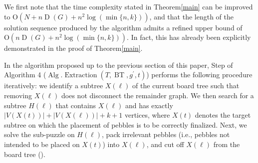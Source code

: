 \documentclass[letter,11pt]{article}
\theoremstyle{definition}
\theoremstyle{definition}
\DeclareMathOperator{\BT}{BT}
\DeclareMathOperator{\Alg}{Alg}
\DeclareMathOperator{\Extraction}{Extraction}
\DeclareMathOperator{\D}{D}
\newcommand{\1}{\boldmath$~1~$\unboldmath}
\newcommand{\Ord}{\mathrm{O}}
\newcommand{\tume}{\hspace*{0.2em}}
\newcommand{\maru}[1]{{\ooalign{\hfill$\small#1$\hfill\crcr\scalebox{1.3}{$\bigcirc$}}}}
\begin{document}
We first note that the time complexity stated in Theorem\tume\ref{main} can be improved to 
$\Ord(N+n\D(G) + n^2 \log(\min\{n,k\}))$, and that the length of the solution sequence produced by 
the algorithm admits a refined upper bound of $\Ord(n\D(G) + n^2 \log(\min\{n,k\}))$.
In fact, this has already been explicitly demonstrated in the proof of Theorem\tume\ref{main}.

In the algorithm proposed up to the previous section of this paper, Step \maru{4} of Algorithm 4 ($\Alg.\Extraction(T, \BT,g^{\prime},t)$) performs the following procedure iteratively:
we identify a subtree $X(\ell)$ of the current board tree such that removing $X(\ell)$ does not disconnect the remainder graph. We then search for a subtree $H(\ell)$ that
contains $X(\ell)$ and has exactly $|V(X(t))| + |V(X(\ell))| + k + 1$ vertices, where $X(t)$ denotes the target subtree on which the placement of pebbles is to be correctly finalized.
Next, we solve the sub-puzzle on $H(\ell)$, pack irrelevant pebbles (i.e., pebbles not intended to be placed on $X(t)$) into $X(\ell)$, and cut off $X(\ell)$ from the board tree (\maru{5}).
\end{document}
